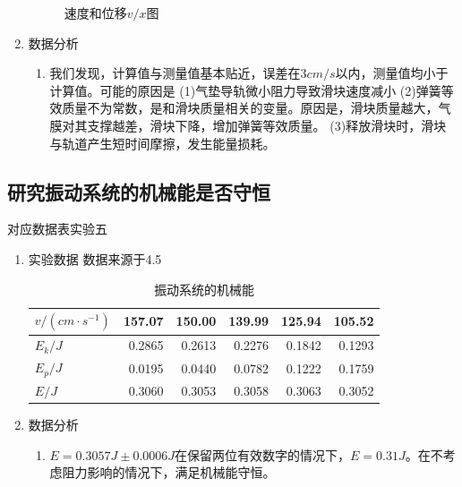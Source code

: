 \documentclass[11pt]{article}
\begin{document}
\begin{enumerate}
\begin{figure}[H]
            \caption{速度和位移$v/x$图}
        \end{figure}
    \item 数据分析
    \begin{enumerate}
        \item 我们发现，计算值与测量值基本贴近，误差在$3cm/s$以内，测量值均小于计算值。可能的原因是
        \newline (1)气垫导轨微小阻力导致滑块速度减小
        \newline (2)弹簧等效质量不为常数，是和滑块质量相关的变量。原因是，滑块质量越大，气膜对其支撑越差，滑块下降，增加弹簧等效质量。
        \newline (3)释放滑块时，滑块与轨道产生短时间摩擦，发生能量损耗。
    \end{enumerate}
\end{enumerate}

\subsection{研究振动系统的机械能是否守恒}
对应数据表实验五
\begin{enumerate}
    \item 实验数据
    \newline 数据来源于4.5
        \begin{table}[H]
          \centering
          \caption{振动系统的机械能}
            \begin{tabular}{|l|r|r|r|r|r|}\hline
                $v/(cm \cdot s^{-1})$ & 157.07  & 150.00  & 139.99  & 125.94  & 105.52  \\\hline
                $E_{k}/J$     & 0.2865  & 0.2613  & 0.2276  & 0.1842  & 0.1293  \\\hline
                $E_{p}/J$     & 0.0195  & 0.0440  & 0.0782  & 0.1222  & 0.1759  \\\hline
                $E/J$      & 0.3060  & 0.3053  & 0.3058  & 0.3063  & 0.3052  \\\hline

            \end{tabular}%
          \label{tab:振动系统的机械能}%
        \end{table}%
    \item 数据分析
    \begin{enumerate}
        \item $E=0.3057J \pm 0.0006J$在保留两位有效数字的情况下，$E=0.31J$。在不考虑阻力影响的情况下，满足机械能守恒。
    \end{enumerate}

\end{enumerate}
\end{document}
